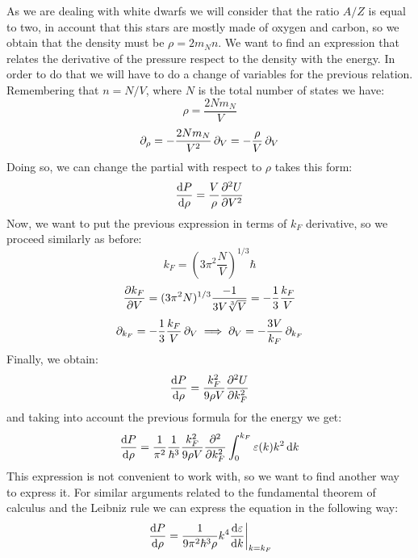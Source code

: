 \documentclass[a4paper]{article}
\begin{document}
As we are dealing with white dwarfs we will consider that the ratio $A/Z$ is equal to two, in account that this stars are mostly made of oxygen and carbon, so we obtain that the density must be $\rho=2m_Nn$. We want to find an expression that relates the derivative of the pressure respect to the density with the energy. In order to do that we will have to do a change of variables for the previous relation. Remembering that $n=N/V$, where $N$ is the total number of states we have:
\begin{equation}
    \rho=\frac{2Nm_N}{V}
\end{equation}
\begin{equation}
    \pdif{\rho}=-\frac{2Nm_N}{V^2}\pdif{V}=-\frac{\rho}{V}\pdif{V}
\end{equation}
Doing so, we can change the partial with respect to $\rho$ takes this form:
\begin{equation}
    \odv{P}{\rho}=\frac{V}{\rho}\pdv[order=2]{U}{V}
\end{equation}
Now, we want to put the previous expression in terms of $k_F$ derivative, so we proceed similarly as before:
\begin{equation}
    k_F=\left(3\pi^2\frac{N}{V}\right)^{1/3}\hbar
\end{equation}
\begin{equation}
    \pdv{k_F}{V}=(3\pi^2N)^{1/3}\frac{-1}{3V\sqrt[3]{V}}=-\frac{1}{3}\frac{k_F}{V}
\end{equation}
\begin{equation}
    \pdif{k_F}=-\frac{1}{3}\frac{k_F}{V}\pdif{V}\implies \pdif{V}=-\frac{3V}{k_F}\pdif{k_F}
\end{equation}
Finally, we obtain:
\begin{equation}
    \odv{P}{\rho}=\frac{k_F^2}{9\rho V}\pdv[order=2]{U}{k_F}
\end{equation}
and taking into account the previous formula for the energy we get:
\begin{equation}
    \odv{P}{\rho}=\frac{1}{\pi^2}\frac{1}{\hbar^3}\frac{k_F^2}{9\rho V}\pdv*[order=2]{\int_{0}^{k_F}\varepsilon(k)k^2 \odif{k}}{k_F}
\end{equation}
This expression is not convenient to work with, so we want to find another way to express it. For similar arguments related to the fundamental theorem of calculus and the Leibniz rule we can express the equation in the following way:
\begin{equation}
    \left.\odv{P}{\rho}=\frac{1}{9\pi^2\hbar^3\rho}k^4\odv{\varepsilon}{k} \right|_{k=k_F}
\end{equation}
\end{document}
